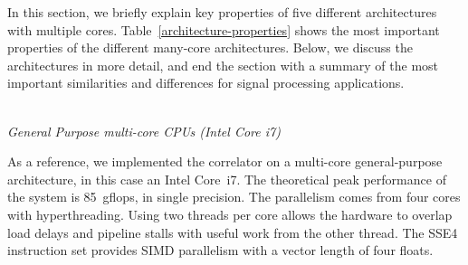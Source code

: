 \documentclass{article}
\begin{document}

In this section, we briefly explain key properties of five different
architectures with multiple cores. Table~\ref{architecture-properties}
shows the most important properties of the different many-core
architectures. Below, we discuss the architectures in more detail, and
end the section with a summary of the most important similarities and
differences for signal processing applications.


\noindent \\ \emph{General Purpose multi-core CPUs (Intel Core i7)}

\noindent As a reference, we implemented the correlator on a multi-core
general-purpose architecture, in this case an Intel Core~i7.  The
theoretical peak performance of the system is 85~gflops, in single
precision.  The parallelism comes from four cores with 
hyperthreading.
Using two threads per core allows the hardware to overlap
load delays and pipeline stalls with useful work from the other thread.
The SSE4 instruction set provides SIMD parallelism with a vector length of four floats.
\end{document}
